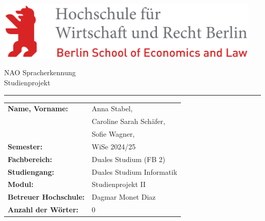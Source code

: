 \documentclass[12pt, oneside]{article}
\newcommand{\studentNameOne}{Anna Stabel}
\newcommand{\studentNameTwo}{Caroline Sarah Schäfer}
\newcommand{\studentNameThree}{Sofie Wagner}
\begin{document}

\thispagestyle{empty}

\includegraphics[width=5in]{../images/HWR.png}

\begin{center}
\Huge
NAO Spracherkennung\\
\Large
Studienprojekt
\hrule
\end{center}


\renewcommand{\arraystretch}{1.3}
\begin{tabular}{l l} 
    \textbf{Name, Vorname:}  & \hspace{3cm} \studentNameOne,\\ 
    {} & \hspace{3cm}\studentNameTwo,\\
    {} & \hspace{3cm}\studentNameThree, \\
    \textbf{Semester:} & \hspace{3cm}WiSe 2024/25\\
    \textbf{Fachbereich:} & \hspace{3cm}Duales Studium (FB 2)\\
    \textbf{Studiengang:} & \hspace{3cm}Duales Studium Informatik\\
    \textbf{Modul:} & \hspace{3cm}Studienprojekt II\\
    \textbf{Betreuer Hochschule:} & \hspace{3cm}Dagmar Monet Diaz\\
    \textbf{Anzahl der Wörter:} & \hspace{3cm}0
\\
\end{tabular}


\titlespacing{\section}{0pt}{0pt}{0pt}
\titlespacing{\subsection}{0pt}{6pt}{0pt}
\titlespacing{\subsubsection}{0pt}{6pt}{0pt}
\end{document}
